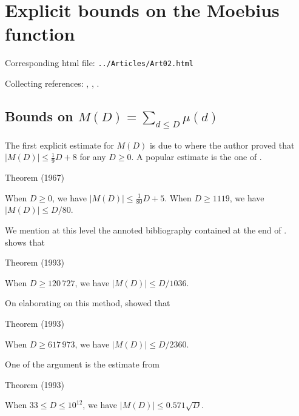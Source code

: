 \chapter{   Explicit bounds on the Moebius function}

Corresponding html file: \texttt{../Articles/Art02.html}










 
 


Collecting references:
\cite{Diamond-Erdos*80},
\cite{Deleglise-Rivat*96-2},
\cite{Borwein-Ferguson-Mossinghoff*08}.


\section{Bounds on $M(D)=\sum_{d\le D}\mu(d)$}


The first explicit estimate for $M(D)$ is due to
\cite{VonSterneck*98}
where the author proved that $|M(D)|\le \tfrac19 D+8$ for any $D\ge0$. 
A popular estimate is the one of
\cite{MacLeod*69}.

\begin{thm}{Theorem (1967)}

When $D\ge 0$, we have $|M(D)|\le \tfrac1{80} D+5$. When $D\ge 1119$, we have $|M(D)|\le D/80$.
\end{thm}

We mention at this level the annoted bibliography contained at the end of 
\cite{Dress*83}.
\cite{CostaPereira*89} shows that

\begin{thm}{Theorem (1993)}

When $D\ge 120\,727$, we have $|M(D)|\le D/1036$.
\end{thm}


On elaborating on this method,
\cite{Dress-ElMarraki*93} showed that

\begin{thm}{Theorem (1993)}

When $D\ge 617\,973$, we have $|M(D)|\le D/2360$.
\end{thm}


One of the argument is the estimate from 
\cite{Dress*93}

\begin{thm}{Theorem (1993)}

When $33\le D\le 10^{12}$, we have $|M(D)|\le 0.571\sqrt{D}$.
\end{thm}


